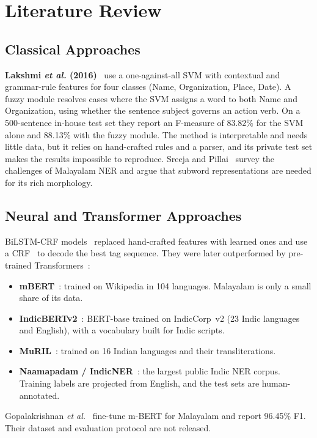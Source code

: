 \chapter{Literature Review}\label{ch:lit}

\section{Classical Approaches}

\textbf{Lakshmi \emph{et al.} (2016)}~\cite{lakshmi2016fuzzy} use a
one-against-all SVM with contextual and grammar-rule features for four
classes (Name, Organization, Place, Date). A fuzzy module resolves cases
where the SVM assigns a word to both Name and Organization, using whether
the sentence subject governs an action verb. On a 500-sentence in-house test
set they report an F-measure of 83.82\% for the SVM alone and 88.13\% with
the fuzzy module. The method is interpretable and needs little data, but it
relies on hand-crafted rules and a parser, and its private test set makes
the results impossible to reproduce. Sreeja and Pillai~\cite{sp2020towards}
survey the challenges of Malayalam NER and argue that subword
representations are needed for its rich morphology.

\section{Neural and Transformer Approaches}

BiLSTM-CRF models~\cite{huang2015bidirectional, lample2016neural} replaced
hand-crafted features with learned ones and use a CRF~\cite{lafferty2001conditional}
to decode the best tag sequence. They were later outperformed by pre-trained
Transformers~\cite{vaswani2017attention}:
\begin{itemize}
  \item \textbf{mBERT}~\cite{devlin2019bert}: trained on Wikipedia in 104
  languages. Malayalam is only a small share of its data.
  \item \textbf{IndicBERTv2}~\cite{doddapaneni2023towards}: BERT-base trained
  on IndicCorp~v2 (23 Indic languages and English), with a vocabulary built
  for Indic scripts.
  \item \textbf{MuRIL}~\cite{khanuja2021muril}: trained on 16 Indian
  languages and their transliterations.
  \item \textbf{Naamapadam / IndicNER}~\cite{mhaske2023naamapadam}: the
  largest public Indic NER corpus. Training labels are projected from
  English, and the test sets are human-annotated.
\end{itemize}
Gopalakrishnan \emph{et al.}~\cite{gopalakrishnan2025efficient} fine-tune
m-BERT for Malayalam and report 96.45\% F1. Their dataset and evaluation
protocol are not released.

